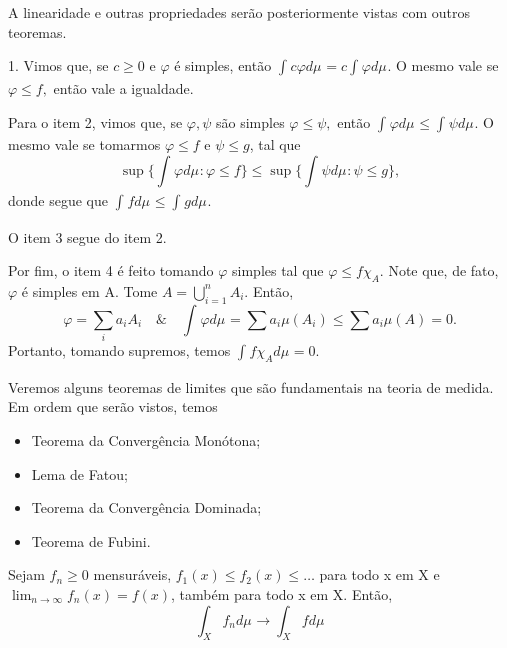 \documentclass[measure_theory.tex]{subfiles}
\begin{document}
\begin{proof*}
	A linearidade e outras propriedades serão posteriormente vistas com outros teoremas.

	1. Vimos que, se \(c \geq 0\) e \(\varphi \) é simples, então \(\int_{}c \varphi  d\mu_{} = c \int_{}\varphi  d\mu_{}\). O mesmo vale se \(\varphi \leq f,\) então vale a igualdade.

	Para o item 2, vimos que, se \(\varphi, \psi\) são simples   \(\varphi \leq \psi,\) então \(\int_{}\varphi  d\mu_{} \leq \int_{}\psi d\mu_{}\). O mesmo vale se tomarmos \(\varphi \leq f\) e \(\psi \leq g\),
	tal que
	\[
		\sup_{}\biggl\{\int_{}\varphi  d\mu_{}: \varphi \leq f\biggr\} \leq \sup_{}\biggl\{\int_{}\psi d\mu_{}: \psi \leq g\biggr\},
	\]
	donde segue que \(\int_{}f d\mu_{} \leq \int_{}g d\mu_{}.\)

	O item 3 segue do item 2.

	Por fim, o item 4 é feito tomando \(\varphi \) simples tal que \(\varphi  \leq f \chi_{A}.\) Note que, de fato, \(\varphi \) é simples em A. Tome \(A = \bigcup_{i=1}^{n}A_{i}.\)
	Então,
	\[
		\varphi = \sum\limits_{i}^{}a_{i}A_{i} \quad\&\quad \int_{}\varphi  d\mu_{} = \sum\limits_{}^{}a_{i}\mu (A_{i}) \leq \sum\limits_{}^{}a_{i}\mu (A) = 0.
	\]
	Portanto, tomando supremos, temos \(\int_{}f \chi_{A} d\mu_{} = 0.\) \qedsymbol
\end{proof*}
Veremos alguns teoremas de limites que são fundamentais na teoria de medida. Em ordem que serão vistos, temos
\begin{itemize}
	\item Teorema da Convergência Monótona;
	\item Lema de Fatou;
	\item Teorema da Convergência Dominada;
	\item Teorema de Fubini.
\end{itemize}
\hypertarget{monotone_convergence}{\begin{theorem*}
		Sejam \(f_{n}\geq 0\) mensuráveis, \(f_{1}(x) \leq f_2(x) \leq \dotsc \) para todo x em X e \(\lim_{n\to \infty}f_{n}(x) = f(x)\), também para todo x em X. Então,
		\[
			\int_{X}f_{n} d\mu_{}\longrightarrow \int_{X}f d\mu_{}
		\]
	\end{theorem*}}
\end{document}
